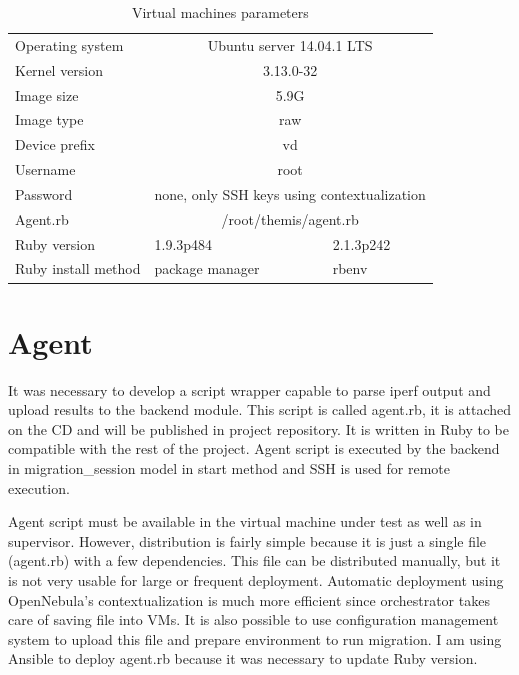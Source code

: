 \begin{table}[htb]
\begin{center}
	\caption{Virtual machines parameters}
	\label{tab:vm-params}
	\begin{tabular}{|l|l|l|}
	\hline
	\Th{Parameter} & \Th{VM for migration} & \Th{Supervisor} \\
	\hline
	Operating system & \multicolumn{2}{c|}{Ubuntu server 14.04.1 LTS} \\
	\hline
	Kernel version & \multicolumn{2}{c|}{3.13.0-32} \\
	\hline
	Image size & \multicolumn{2}{c|}{5.9G} \\
	\hline
	Image type & \multicolumn{2}{c|}{raw} \\
	\hline
	Device prefix & \multicolumn{2}{c|}{vd} \\
	\hline
	Username & \multicolumn{2}{c|}{root} \\
	\hline
	Password & \multicolumn{2}{c|}{none, only \Ac{SSH} keys using contextualization}\\
	\hline
	Agent.rb & \multicolumn{2}{c|}{/root/themis/agent.rb}\\
	\hline
	Ruby version & 1.9.3p484 & 2.1.3p242 \\
	\hline
	Ruby install method & package manager & rbenv \\
	\hline
	\end{tabular}
\end{center}
\end{table}


\section{Agent}
It was necessary to develop a script wrapper capable to parse iperf output and upload results to the backend module. This script is called agent.rb, it is attached on the CD and will be published in project repository. It is written in Ruby to be compatible with the rest of the project. Agent script is executed by the backend in migration\_session model in start method and \Ac{SSH} is used for remote execution.

Agent script must be available in the virtual machine under test as well as in supervisor. However, distribution is fairly simple because it is just a single file (agent.rb) with a few dependencies. This file can be distributed manually, but it is not very usable for large or frequent deployment. Automatic deployment using OpenNebula's contextualization is much more efficient since orchestrator takes care of saving file into \Ac{VM}s. 
It is also possible to use configuration management system to upload this file and prepare environment to run migration. I am using Ansible to deploy agent.rb because it was necessary to update Ruby version. 

